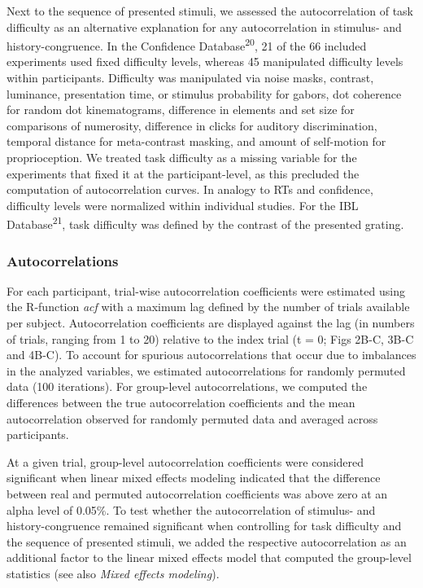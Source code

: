 \documentclass[
]{article}
\begin{document}
Next to the sequence of presented stimuli, we assessed the
autocorrelation of task difficulty as an alternative explanation for any
autocorrelation in stimulus- and history-congruence. In the Confidence
Database\textsuperscript{20}, 21 of the 66 included experiments used
fixed difficulty levels, whereas 45 manipulated difficulty levels within
participants. Difficulty was manipulated via noise masks, contrast,
luminance, presentation time, or stimulus probability for gabors, dot
coherence for random dot kinematograms, difference in elements and set
size for comparisons of numerosity, difference in clicks for auditory
discrimination, temporal distance for meta-contrast masking, and amount
of self-motion for proprioception. We treated task difficulty as a
missing variable for the experiments that fixed it at the
participant-level, as this precluded the computation of autocorrelation
curves. In analogy to RTs and confidence, difficulty levels were
normalized within individual studies. For the IBL
Database\textsuperscript{21}, task difficulty was defined by the
contrast of the presented grating.

\hypertarget{autocorrelations}{%
\subsubsection{Autocorrelations}\label{autocorrelations}}

For each participant, trial-wise autocorrelation coefficients were
estimated using the R-function \emph{acf} with a maximum lag defined by
the number of trials available per subject. Autocorrelation coefficients
are displayed against the lag (in numbers of trials, ranging from 1 to
20) relative to the index trial (t = 0; Figs 2B-C, 3B-C and 4B-C). To
account for spurious autocorrelations that occur due to imbalances in
the analyzed variables, we estimated autocorrelations for randomly
permuted data (100 iterations). For group-level autocorrelations, we
computed the differences between the true autocorrelation coefficients
and the mean autocorrelation observed for randomly permuted data and
averaged across participants.

At a given trial, group-level autocorrelation coefficients were
considered significant when linear mixed effects modeling indicated that
the difference between real and permuted autocorrelation coefficients
was above zero at an alpha level of 0.05\%. To test whether the
autocorrelation of stimulus- and history-congruence remained significant
when controlling for task difficulty and the sequence of presented
stimuli, we added the respective autocorrelation as an additional factor
to the linear mixed effects model that computed the group-level
statistics (see also \emph{Mixed effects modeling}).
\end{document}
